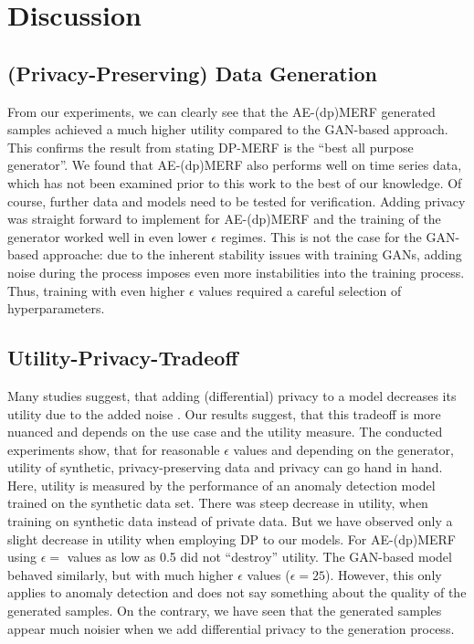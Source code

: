 \section{Discussion}

\subsection{(Privacy-Preserving) Data Generation}
From our experiments, we can clearly see that the AE-(dp)MERF generated samples achieved a much higher utility compared to the GAN-based approach. This confirms the result from \parencite{hu2023sok} stating DP-MERF is the ``best all purpose generator''. We found that AE-(dp)MERF also performs well on time series data, which has not been examined prior to this work to the best of our knowledge. Of course, further data and models need to be tested for verification. Adding privacy was straight forward to implement for AE-(dp)MERF and the training of the generator worked well in even lower $\epsilon$ regimes. This is not the case for the GAN-based approache: due to the inherent stability issues with training GANs, adding noise during the process imposes even more instabilities into the training process. Thus, training with even higher \(\epsilon\) values required a careful selection of hyperparameters.


\subsection{Utility-Privacy-Tradeoff}

Many studies suggest, that adding (differential) privacy to a model decreases its utility due to the added noise \parencite[see e.g.][]{sreekumar2019optimal,zamani2023privacy,stadler2022synthetic}. Our results suggest, that this tradeoff is more nuanced and depends on the use case and the utility measure. The conducted experiments show, that for reasonable $\epsilon$ values and depending on the generator, utility of synthetic, privacy-preserving data and privacy can go hand in hand.  Here, utility is measured by the performance of an anomaly detection model trained on the synthetic data set. There was steep decrease in utility, when training on synthetic data instead of private data. But we have observed only a slight decrease in utility when employing DP to our models. For AE-(dp)MERF using $\epsilon=$ values as low as 0.5 did not ``destroy'' utility. The GAN-based model behaved similarly, but with much higher \(\epsilon\) values ($\epsilon=25$). However, this only applies to anomaly detection and does not say something about the quality of the generated samples. On the contrary, we have seen that the generated samples appear much noisier when we add differential privacy to the generation process.

